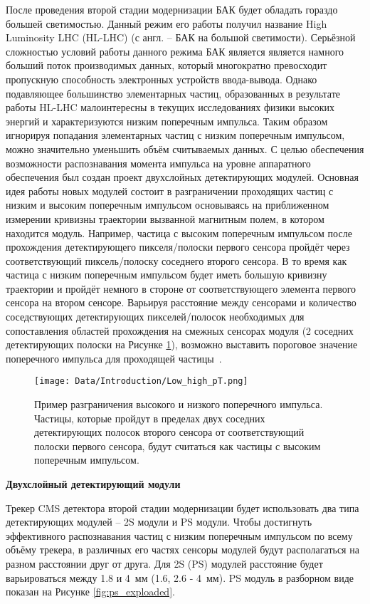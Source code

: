 После проведения второй стадии модернизации БАК будет обладать гораздо большей светимостью. Данный режим его работы получил название High Luminosity LHC (HL-LHC) (с англ. -- БАК на большой светимости). Серьёзной сложностью условий работы данного режима БАК является является намного больший поток производимых данных, который многократно превосходит пропускную способность электронных устройств ввода-вывода. Однако подавляющее большинство элементарных частиц, образованных в результате работы HL-LHC малоинтересны в текущих исследованиях физики высоких энергий и характеризуются низким поперечным импульса. Таким образом игнорируя попадания элементарных частиц с низким поперечным импульсом, можно значительно уменьшить объём считываемых данных. С целью обеспечения возможности распознавания момента импульса на уровне аппаратного обеспечения был создан проект двухслойных детектирующих модулей. Основная идея работы новых модулей состоит в разграничении проходящих частиц с низким и высоким поперечным импульсом основываясь на приближенном измерении кривизны траектории вызванной магнитным полем, в котором находится модуль. Например, частица с высоким поперечным импульсом после прохождения детектирующего пикселя/полоски первого сенсора пройдёт через соответствующий пиксель/полоску соседнего второго сенсора. В то время как частица с низким поперечным импульсом будет иметь большую кривизну траектории и пройдёт немного в стороне от соответствующего элемента первого сенсора на втором сенсоре. Варьируя расстояние между сенсорами и количество соседствующих детектирующих пикселей/полосок необходимых для сопоставления областей прохождения на смежных сенсорах модуля (2 соседних детектирующих полоски на Рисунке \ref{fig:low_high_pT}), возможно выставить пороговое значение поперечного импульса для проходящей частицы~\cite{CMS_TECH_PHASE_II}.


\begin{figure}[ht]\centering
\texttt{[image: Data/Introduction/Low\_high\_pT.png]}
\caption{Пример разграничения высокого и низкого поперечного импульса. Частицы, которые пройдут в пределах двух соседних детектирующих полосок второго сенсора от соответствующий полоски первого сенсора, будут считаться как частицы с высоким поперечным импульсом.}
\label{fig:low_high_pT}
\end{figure}


\textbf{Двухслойный детектирующий модули}

Трекер CMS детектора второй стадии модернизации будет использовать два типа детектирующих модулей -- 2S модули и PS модули. Чтобы достигнуть эффективного распознавания частиц с низким поперечным импульсом по всему объёму трекера, в различных его частях сенсоры модулей будут располагаться на разном расстоянии друг от друга. Для 2S (PS) модулей расстояние будет варьироваться между 1.8 и 4~мм (1.6, 2.6 - 4~мм). PS модуль в разборном виде показан на Рисунке \ref{fig:ps_exploaded}.

